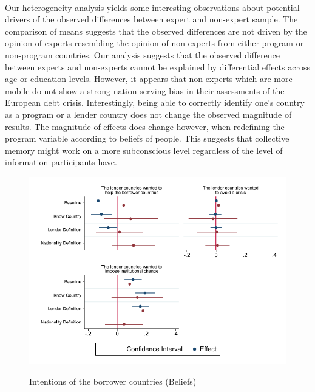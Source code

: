 \\
Our heterogeneity analysis yields some interesting observations about potential drivers of the observed differences between expert and non-expert sample. The comparison of means suggests that the observed differences are not driven by the opinion of experts resembling the opinion of non-experts from either program or non-program countries. 
Our analysis suggests that the observed difference between experts and non-experts cannot be explained by differential effects across age or education levels. However, it appears that non-experts which are more mobile do not show a strong nation-serving bias in their assessments of the European debt crisis. Interestingly, being able to correctly identify one's country as a program or a lender country does not change the observed magnitude of results. The magnitude of effects does change however, when redefining the program variable according to beliefs of people. This suggests that collective memory might work on a more subconscious level regardless of the level of information participants have. 
\\
\begin{figure} [h!]
    \begin{center}
     \caption{ Intentions of the borrower countries (Beliefs)}
    \includegraphics[scale=1.2]{belief_question2.pdf}
    \label{fig:my_label}
    \end{center}
    \tiny 
\end{figure}
